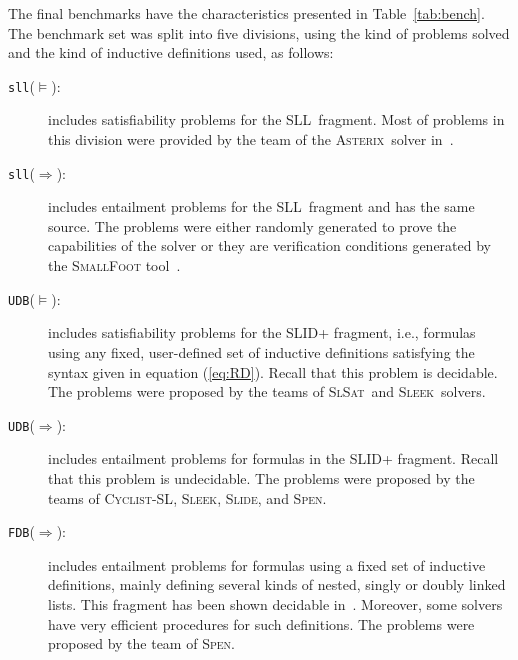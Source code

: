 \documentclass[twoside,11pt]{article}
\newcommand{\limp}{\Rightarrow}
\newcommand{\SLRD}{\textsc{SLID}}
\newcommand{\SLL}{\textsc{SLL}}
\newcommand{\sllsat}{\texttt{sll}($\models$)}
\newcommand{\sllent}{\texttt{sll}($\limp$)}
\newcommand{\FDBent}{\texttt{FDB}($\limp$)}
\newcommand{\UDBsat}{\texttt{UDB}($\models$)}
\newcommand{\UDBent}{\texttt{UDB}($\limp$)}
\newcommand{\ASTERIX}{\textsc{Asterix}}
\newcommand{\CYCLIST}{\textsc{Cyclist-SL}}
\newcommand{\SLEEK}{\textsc{Sleek}}
\newcommand{\SLIDE}{\textsc{Slide}}
\newcommand{\SLSAT}{\textsc{SlSat}}
\newcommand{\SPEN}{\textsc{Spen}}
\begin{document}
The final benchmarks have the characteristics presented in Table~\ref{tab:bench}.
The benchmark set was split into five divisions, using the kind of problems solved and the kind of inductive definitions used, as follows:
\begin{description}
\item[\sllsat:] includes satisfiability problems for the \SLL\ fragment.
Most of problems in this division were provided by the team of the \ASTERIX\ solver in~\cite{PerezR11}.

\item[\sllent:] includes entailment problems for the \SLL\ fragment and has the same source. The problems were either randomly generated to prove the capabilities of the solver or they are verification conditions generated by the \textsc{SmallFoot} tool~\cite{SmallFootsite}.

\item[\UDBsat:] includes satisfiability problems for the \SLRD+ fragment, i.e., formulas using any fixed, user-defined set of inductive definitions satisfying the syntax given in equation (\ref{eq:RD}).
Recall that this problem is decidable. 
The problems were proposed by the teams of \SLSAT\ and \SLEEK\ solvers.

\item[\UDBent:] includes entailment problems for formulas in the \SLRD+ fragment.
Recall that this problem is undecidable. 
The problems were proposed by the teams of \CYCLIST, \SLEEK, \SLIDE, and \SPEN.

\item[\FDBent:] includes entailment problems for formulas using a fixed set of inductive definitions, mainly defining several kinds of nested, singly or doubly linked lists. This fragment has been shown decidable in~\cite{AntonopoulosGHKO14,EneaLSV14}.
Moreover, some solvers have very efficient procedures for such definitions.
The problems were proposed by the team of \SPEN.
\end{description} 
 
\end{document}
